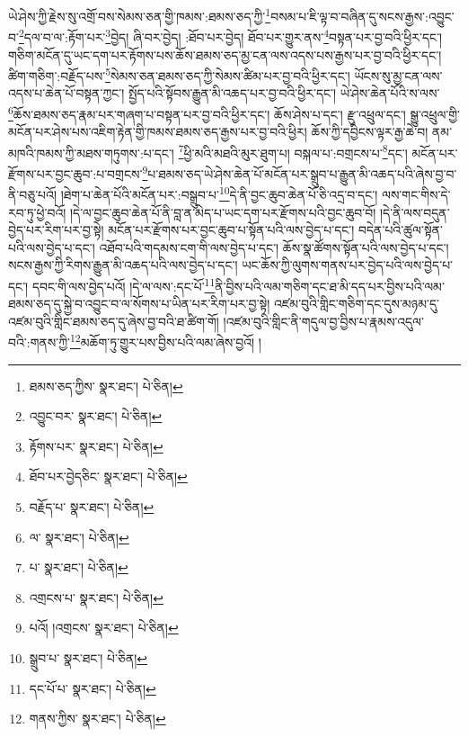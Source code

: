 ཡེ་ཤེས་ཀྱི་རྗེས་སུ་འགྲོ་བས་སེམས་ཅན་གྱི་ཁམས་:ཐམས་ཅད་ཀྱི་\footnote{ཐམས་ཅད་ཀྱིས་  སྣར་ཐང་།  པེ་ཅིན། }བསམ་པ་ཇི་ལྟ་བ་བཞིན་དུ་སངས་རྒྱས་:འབྱུང་བ་\footnote{འབྱུང་བར་  སྣར་ཐང་།  པེ་ཅིན། }དལ་བ་ལ་:རྟོག་པར་\footnote{རྟོགས་པར་  སྣར་ཐང་།  པེ་ཅིན། }བྱེད། ཞི་བར་བྱེད། :ཐོབ་པར་བྱེད། ཐོབ་པར་གྱུར་ནས་\footnote{ཐོབ་པར་བྱེདཅིང་  སྣར་ཐང་།  པེ་ཅིན། }བསྟན་པར་བྱ་བའི་ཕྱིར་དང་། གཅིག་མངོན་དུ་ཡང་དག་པར་རྟོགས་པས་ཆོས་ཐམས་ཅད་མྱ་ངན་ལས་འདས་པས་རྒྱས་པར་བྱ་བའི་ཕྱིར་དང་། ཚིག་གཅིག་:བརྗོད་པས་\footnote{བརྗོད་པ་  སྣར་ཐང་།  པེ་ཅིན། }སེམས་ཅན་ཐམས་ཅད་ཀྱི་སེམས་ཚིམ་པར་བྱ་བའི་ཕྱིར་དང་། ཡོངས་སུ་མྱ་ངན་ལས་འདས་པ་ཆེན་པོ་བསྟན་ཀྱང་། སྤྱོད་པའི་སྟོབས་རྒྱུན་མི་འཆད་པར་བྱ་བའི་ཕྱིར་དང་། ཡེ་ཤེས་ཆེན་པོའི་ས་ལས་\footnote{ལ་  སྣར་ཐང་།  པེ་ཅིན། }ཆོས་ཐམས་ཅད་རྣམ་པར་གཞག་པ་བསྟན་པར་བྱ་བའི་ཕྱིར་དང་། ཆོས་ཤེས་པ་དང་། རྫུ་འཕྲུལ་དང་། སྒྱུ་འཕྲུལ་གྱི་མངོན་པར་ཤེས་པས་འཇིག་རྟེན་གྱི་ཁམས་ཐམས་ཅད་རྒྱས་པར་བྱ་བའི་ཕྱིར། ཆོས་ཀྱི་དབྱིངས་ལྟར་རྒྱ་ཆེ་བ། ནམ་མཁའི་ཁམས་ཀྱི་མཐས་གཏུགས་:པ་དང་། \footnote{པ་  སྣར་ཐང་།  པེ་ཅིན། }ཕྱི་མའི་མཐའི་མུར་ཐུག་པ། བསྐལ་པ་:བགྲངས་པ་\footnote{འགྲངས་པ་  སྣར་ཐང་།  པེ་ཅིན། }དང་། མངོན་པར་རྫོགས་པར་བྱང་ཆུབ་:པ་བགྲངས་\footnote{པའོ། །འགྲངས་  སྣར་ཐང་།  པེ་ཅིན། }པ་ཐམས་ཅད་ཡེ་ཤེས་ཆེན་པོ་མངོན་པར་སྒྲུབ་པ་རྒྱུན་མི་འཆད་པའི་ཞེས་བྱ་བ་ནི་བཅུ་པའོ། །ཐེག་པ་ཆེན་པོའི་མངོན་པར་:བསྒྲུབ་པ་\footnote{སྒྲུབ་པ་  སྣར་ཐང་།  པེ་ཅིན། }དེ་ནི་བྱང་ཆུབ་ཆེན་པོ་ཅི་འདྲ་བ་དང་། ལས་གང་གིས་དེ་རབ་ཏུ་ཕྱེ་བའོ། །དེ་ལ་བྱང་ཆུབ་ཆེན་པོ་ནི་བླ་ན་མེད་པ་ཡང་དག་པར་རྫོགས་པའི་བྱང་ཆུབ་བོ། །དེ་ནི་ལས་བདུན་བྱེད་པར་རིག་པར་བྱ་སྟེ། མངོན་པར་རྫོགས་པར་བྱང་ཆུབ་པ་སྟོན་པའི་ལས་བྱེད་པ་དང་། བདེན་པའི་ཚུལ་སྟོན་པའི་ལས་བྱེད་པ་དང་། འཐོབ་པའི་གདམས་ངག་གི་ལས་བྱེད་པ་དང་། ཆོས་སྣ་ཚོགས་སྟོན་པའི་ལས་བྱེད་པ་དང་། སངས་རྒྱས་ཀྱི་རིགས་རྒྱུན་མི་འཆད་པའི་ལས་བྱེད་པ་དང་། ཡང་ཆོས་ཀྱི་ལུགས་གནས་པར་བྱེད་པའི་ལས་བྱེད་པ་དང་། དབང་གི་ལས་བྱེད་པའོ། །དེ་ལ་ལས་:དང་པོ་\footnote{དང་པོ་པ་  སྣར་ཐང་།  པེ་ཅིན། }ནི་བྱིས་པའི་ལམ་གཅིག་དང་ཐ་མི་དད་པར་བྱིས་པའི་ལམ་ཐམས་ཅད་དུ་སྐྱེ་བ་འབྱུང་བ་ལ་སོགས་པ་ཡིན་པར་རིག་པར་བྱ་སྟེ། འཛམ་བུའི་གླིང་གཅིག་དང་དུས་མཉམ་དུ་འཛམ་བུའི་གླིང་ཐམས་ཅད་དུ་ཞེས་བྱ་བའི་ཐ་ཚིག་གོ། །འཛམ་བུའི་གླིང་ནི་གདུལ་བྱ་བྱིས་པ་རྣམས་འདུལ་བའི་:གནས་ཀྱི་\footnote{གནས་ཀྱིས་  སྣར་ཐང་།  པེ་ཅིན། }མཆོག་ཏུ་གྱུར་པས་བྱིས་པའི་ལམ་ཞེས་བྱའོ། །
